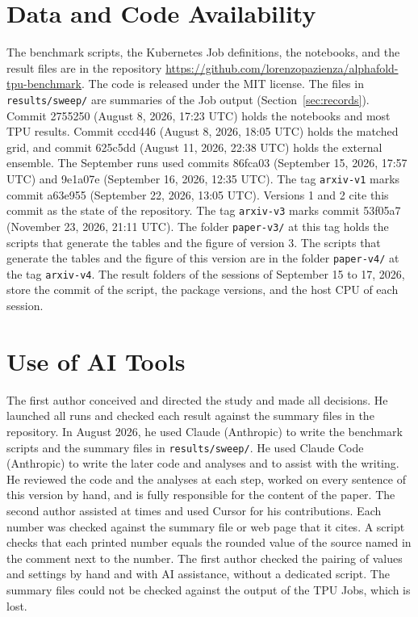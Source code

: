 \section*{Data and Code Availability}
The benchmark scripts, the Kubernetes Job definitions, the notebooks, and the result files are in the repository
\url{https://github.com/lorenzopazienza/alphafold-tpu-benchmark}. The code is released under the MIT license. The files
in \texttt{results/sweep/} are summaries of the Job output (Section~\ref{sec:records}).
Commit 2755250 (August 8, 2026, 17:23 UTC) holds the notebooks and most TPU results. %
Commit cccd446 (August 8, 2026, 18:05 UTC) holds the matched grid, and commit 625c5dd (August 11, 2026, 22:38 UTC) holds the external ensemble. %
The September runs used commits 86fca03 (September 15, 2026, 17:57 UTC) and 9e1a07e (September 16, 2026, 12:35 UTC). %
The tag \texttt{arxiv-v1} marks commit a63e955 (September 22, 2026, 13:05 UTC). Versions 1 and 2 cite this commit as the state of the repository. %
The tag \texttt{arxiv-v3} marks commit 53f05a7 (November 23, 2026, 21:11 UTC). %
The folder \texttt{paper-v3/} at this tag holds the scripts that
generate the tables and the figure of version 3. The scripts that generate the tables and the figure of this
version are in the folder \texttt{paper-v4/} at the tag \texttt{arxiv-v4}.
The result folders of the sessions of September 15 to 17, 2026, store the commit of the script, the package versions, and the host CPU of each session. %

\section*{Use of AI Tools}
The first author conceived and directed the study and made all decisions. He launched all runs and checked each result
against the summary files in the repository.
In August 2026, he used Claude (Anthropic) to write the benchmark scripts and the summary files in \texttt{results/sweep/}. %
He used Claude Code (Anthropic) to write the later code and analyses and to assist with the writing.
He reviewed the code and the analyses at each step, worked on every sentence of this version by hand, and
is fully responsible for the content of the paper. The second author assisted at times and used Cursor for his
contributions. Each number was checked against the summary file or web page that it cites. A script checks that each printed number equals the rounded value of the source named in the comment next to the number.
The first author checked the pairing of values and settings by hand and with AI assistance, without a dedicated script.
The summary files could not be checked against the output of the TPU Jobs,
which is lost.

